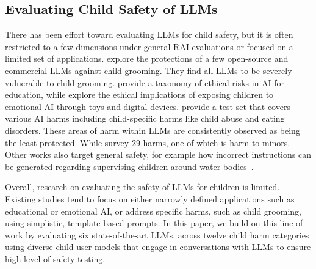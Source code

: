 \subsection{Evaluating Child Safety of LLMs }
\label{subsec:eval_child_safety}
There has been effort toward evaluating LLMs for child safety, but it is often restricted to a few dimensions under general RAI evaluations or focused on a limited set of applications.
\citet{prosser2024helpful} explore the protections of a few open-source and commercial LLMs against child grooming. They find all LLMs to be severely vulnerable to child grooming. \citet{CHAUNCEY2023100182} provide a taxonomy of ethical risks in AI for education, while \citet{mcstay2021emotional} explore the ethical implications of exposing children to emotional AI through toys and digital devices.
\citet{vidgen2024simplesafetytests} provide a test set that covers various AI harms including child-specific harms like child abuse and eating disorders. These areas of harm within LLMs are consistently observed as being the least protected. 
While \citet{liu2024trustworthy} survey 29 harms, one of which is harm to minors. Other works also target general safety, for example how incorrect instructions can be generated regarding supervising children around water bodies~\cite{oviedo2023risks}.

Overall, research on evaluating the safety of LLMs for children is limited. Existing studies tend to focus on either narrowly defined applications such as educational or emotional AI, or address specific harms, such as child grooming, using simplistic, template-based prompts.
In this paper, we build on this line of work by evaluating six state-of-the-art LLMs, across twelve child harm categories using diverse child user models that engage in conversations with LLMs to ensure high-level of safety testing.